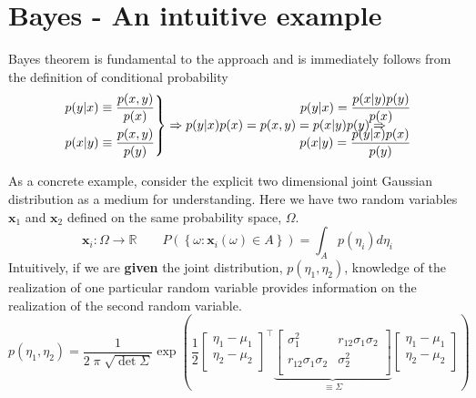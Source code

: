 \documentclass{article}         %
\theoremstyle{definition}
\theoremstyle{remark}
\begin{document}
\nocite{*}



\appendix
\section{Bayes - An intuitive example}\label{IntuitiveBayes}
Bayes theorem is fundamental to the approach and is immediately
follows from the definition of conditional probability
\[
\left.
\begin{split}
p(y|x)  \equiv  \frac{p(x,y)}{p(x)}  \\
p(x|y)  \equiv  \frac{p(x,y)}{p(y)} 
\end{split}
\right\}
\Rightarrow
p(y|x) p(x) = p(x,y) = p(x|y) p(y)
\Rightarrow
\hspace{-1in}
\begin{split}
p(y|x)  =\frac{ p(x|y) p(y) }{p(x) } \\
p(x|y)  =\frac{ p(y|x) p(x) }{p(y) } \\
\end{split}
\]

As a concrete example, consider the explicit two dimensional joint Gaussian
distribution as a medium for understanding. Here we have two random
variables $\mathbf{x}_1$ and $\mathbf{x}_2$ defined on the same probability
space, $\Omega$.
\[
\mathbf{x}_i: \Omega \rightarrow \mathbb{R}
\qquad
P\left( \left\{ \omega: 
\mathbf{x}_i (\omega) \in A
 \right\}\right)
=
\int_A p(\eta_i) d\eta_i
\]
Intuitively, if we are \textbf{given} the joint distribution,
$p(\eta_1,\eta_2)$, knowledge of the realization of one particular random
variable provides information on the realization of the second random
variable.
\[
      p(\eta_1,\eta_2)  = \frac{1}{2 \; \pi \; \sqrt{\det{\Sigma}}}
\exp\left( \frac{1}{2}
\begin{bmatrix}
\eta_1 - \mu_1 \\
\eta_2 - \mu_2 \\
\end{bmatrix}^\top
\underbrace{
\begin{bmatrix}
       \sigma_1^2        & r_{12} \sigma_1 \sigma_2 \\
r_{12} \sigma_1 \sigma_2 &          \sigma_2^2 \\
\end{bmatrix}
}_{\equiv \Sigma}
\begin{bmatrix}
\eta_1 - \mu_1 \\
\eta_2 - \mu_2 \\
\end{bmatrix}
\right)
\]
\end{document}
